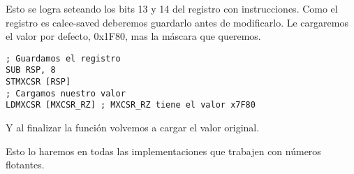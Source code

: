 Esto se logra seteando los bits 13 y 14 del registro  con instrucciones.
Como el registro es calee-saved deberemos guardarlo antes de modificarlo.
Le cargaremos el valor por defecto, 0x1F80, mas la máscara que queremos.

\begin{lstlisting}
; Guardamos el registro
SUB RSP, 8
STMXCSR [RSP]
; Cargamos nuestro valor
LDMXCSR [MXCSR_RZ] ; MXCSR_RZ tiene el valor x7F80
\end{lstlisting}

Y al finalizar la función volvemos a cargar el valor original.

Esto lo haremos en todas las implementaciones que trabajen con números flotantes.

